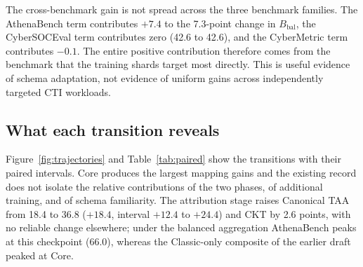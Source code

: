 \documentclass[preprint,12pt,authoryear]{elsarticle}
\newcommand{\Bbal}{B_{\mathrm{bal}}}
\begin{document}
The cross-benchmark gain is not spread across the three benchmark families. The AthenaBench term contributes $+7.4$ to the 7.3-point change in $\Bbal$, the CyberSOCEval term contributes zero (42.6 to 42.6), and the CyberMetric term contributes $-0.1$. The entire positive contribution therefore comes from the benchmark that the training shards target most directly. This is useful evidence of schema adaptation, not evidence of uniform gains across independently targeted CTI workloads.

\subsection{What each transition reveals}
Figure~\ref{fig:trajectories} and Table~\ref{tab:paired} show the transitions with their paired intervals. Core produces the largest mapping gains and the existing record does not isolate the relative contributions of the two phases, of additional training, and of schema familiarity. The attribution stage raises Canonical TAA from 18.4 to 36.8 ($+18.4$, interval $+12.4$ to $+24.4$) and CKT by 2.6 points, with no reliable change elsewhere; under the balanced aggregation AthenaBench peaks at this checkpoint (66.0), whereas the Classic-only composite of the earlier draft peaked at Core.
\end{document}

